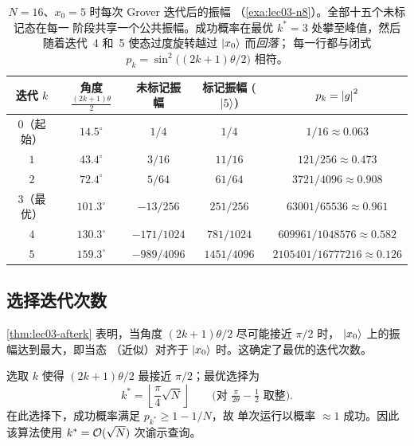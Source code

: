 \begin{table}[t]
\centering
\begin{tabular}{ccccc}
\toprule
迭代 $k$ & 角度 $\tfrac{(2k+1)\theta}{2}$ & 未标记振幅 & 标记振幅 ($\ket5$) & $p_k=\left\lvert g \right\rvert^2$\\
\midrule
$0$（起始）    & $14.5^{\circ}$  & $1/4$       & $1/4$       & $1/16\approx0.063$\\
$1$            & $43.4^{\circ}$  & $3/16$      & $11/16$     & $121/256\approx0.473$\\
$2$            & $72.4^{\circ}$  & $5/64$      & $61/64$     & $3721/4096\approx0.908$\\
$3$（最优）  & $101.3^{\circ}$ & $-13/256$   & $251/256$   & $63001/65536\approx0.961$\\
$4$            & $130.3^{\circ}$ & $-171/1024$ & $781/1024$  & $609961/1048576\approx0.582$\\
$5$            & $159.3^{\circ}$ & $-989/4096$ & $1451/4096$ & $2105401/16777216\approx0.126$\\
\bottomrule
\end{tabular}
\caption{$N=16$、$x_0=5$ 时每次 Grover 迭代后的振幅
（\cref{exa:lec03-n8}）。全部十五个未标记态在每一
阶段共享一个公共振幅。成功概率在最优 $k^{\ast}=3$ 处攀至峰值，然后
随着迭代~4 和~5 使态过度旋转越过 $\ket{x_0}$ 而\emph{回落}；
每一行都与闭式 $p_k=\sin^{2}\bigl((2k+1)\theta/2\bigr)$ 相符。}
\label{tab:lec03-n8}
\end{table}

\subsection{选择迭代次数}
\label{sec:lec03-iterations}

\cref{thm:lec03-afterk} 表明，当角度 $(2k+1)\theta/2$ 尽可能接近 $\pi/2$ 时，
$\ket{x_0}$ 上的振幅达到最大，即当态
（近似）对齐于 $\ket{x_0}$ 时。这确定了最优的迭代次数。

\begin{theorem}[最优迭代次数]
\label{thm:lec03-kstar}
选取 $k$ 使得 $(2k+1)\theta/2$ 最接近 $\pi/2$；最优选择为
\[
  k^{\ast}=\left\lfloor\frac{\pi}{4}\sqrt N\right\rfloor
  \qquad\bigl(\text{对 } \tfrac{\pi}{2\theta}-\tfrac12 \text{ 取整}\bigr).
\]
在此选择下，成功概率满足 $p_{k^{\ast}}\ge 1-1/N$，故
单次运行以概率 $\approx1$ 成功。因此该算法使用
$k^{\ast}=\mathcal{O}(\sqrt N)$ 次谕示查询。
\end{theorem}

